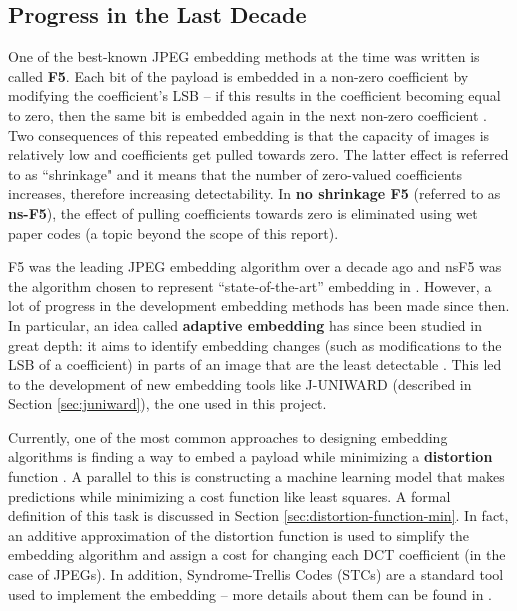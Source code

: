 \documentclass[11pt,a4paper,twoside,openright]{report}
\begin{document}
\subsection{Progress in the Last Decade} \label{sec:embed-progress}

One of the best-known JPEG embedding methods at the time \cite{2008-paper} was written is called \textbf{F5}. Each bit of the payload is embedded in a non-zero coefficient by modifying the coefficient's LSB -- if this results in the coefficient becoming equal to zero, then the same bit is embedded again in the next non-zero coefficient \cite{f5}. Two consequences of this repeated embedding is that the capacity of images is relatively low and coefficients get pulled towards zero. The latter effect is referred to as ``shrinkage" and it means that the number of zero-valued coefficients increases, therefore increasing detectability. In \textbf{no shrinkage F5} (referred to as \textbf{ns-F5}), the effect of pulling coefficients towards zero is eliminated using wet paper codes \cite{no-shrinkage-f5} (a topic beyond the scope of this report).

F5 was the leading JPEG embedding algorithm over a decade ago \cite{ker-notes} and nsF5 was the algorithm chosen to represent ``state-of-the-art'' embedding in \cite{2008-paper}. However, a lot of progress in the development embedding methods has been made since then. In particular, an idea called \textbf{adaptive embedding} has since been studied in great depth: it aims to identify embedding changes (such as modifications to the LSB of a coefficient) in parts of an image that are the least detectable \cite{ker-notes}. This led to the development of new embedding tools like J-UNIWARD (described in Section \ref{sec:juniward}), the one used in this project.

Currently, one of the most common approaches to designing embedding algorithms is finding a way to embed a payload while minimizing a \textbf{distortion} function \cite{costs-and-capacity}. A parallel to this is constructing a machine learning model that makes predictions while minimizing a cost function like least squares. A formal definition of this task is discussed in Section \ref{sec:distortion-function-min}. In fact, an additive approximation of the distortion function is used to simplify the embedding algorithm and assign a cost for changing each DCT coefficient (in the case of JPEGs). In addition, Syndrome-Trellis Codes (STCs) are a standard tool used to implement the embedding -- more details about them can be found in \cite{stc-paper}.
\end{document}
